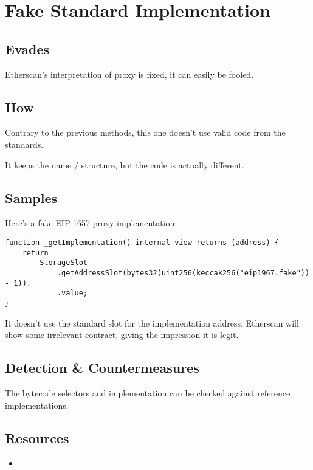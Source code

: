 \section{Fake Standard Implementation}

\subsection{Evades}

Etherscan's interpretation of proxy is fixed, it can easily be fooled.

\subsection{How}

Contrary to the previous methods, this one doesn't use valid code from the standards.

It keeps the name / structure, but the code is actually different.

\subsection{Samples}

Here's a fake EIP-1657 proxy implementation:

\begin{lstlisting}[language=Solidity]
function _getImplementation() internal view returns (address) {
    return
        StorageSlot
            .getAddressSlot(bytes32(uint256(keccak256("eip1967.fake")) - 1)).
            .value;
}
\end{lstlisting}

It doesn't use the standard slot for the implementation address:
Etherscan will show some irrelevant contract, giving the impression it is legit.

\subsection{Detection \& Countermeasures}

The bytecode selectors and implementation can be checked against reference implementations.

\subsection{Resources}

\begin{itemize}
\item{\cite{video-masquerading-code}}
\end{itemize}
